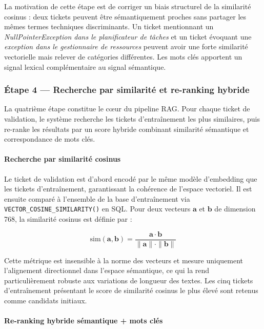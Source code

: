 La motivation de cette étape est de corriger un biais structurel de la similarité cosinus : deux tickets peuvent être sémantiquement proches sans partager les mêmes termes techniques discriminants. Un ticket mentionnant un \textit{NullPointerException dans le planificateur de tâches} et un ticket évoquant une \textit{exception dans le gestionnaire de ressources} peuvent avoir une forte similarité vectorielle mais relever de catégories différentes. Les mots clés apportent un signal lexical complémentaire au signal sémantique.

\subsubsection{Étape 4 — Recherche par similarité et re-ranking hybride}

La quatrième étape constitue le cœur du pipeline RAG. Pour chaque ticket de validation, le système recherche les tickets d'entraînement les plus similaires, puis re-ranke les résultats par un score hybride combinant similarité sémantique et correspondance de mots clés.

\paragraph{Recherche par similarité cosinus}

Le ticket de validation est d'abord encodé par le même modèle d'embedding que les tickets d'entraînement, garantissant la cohérence de l'espace vectoriel. Il est ensuite comparé à l'ensemble de la base d'entraînement via \texttt{VECTOR\_COSINE\_SIMILARITY()} en SQL. Pour deux vecteurs $\mathbf{a}$ et $\mathbf{b}$ de dimension 768, la similarité cosinus est définie par :

$$\text{sim}(\mathbf{a}, \mathbf{b}) = \frac{\mathbf{a} \cdot \mathbf{b}}{\|\mathbf{a}\| \cdot \|\mathbf{b}\|}$$

Cette métrique est insensible à la norme des vecteurs et mesure uniquement l'alignement directionnel dans l'espace sémantique, ce qui la rend particulièrement robuste aux variations de longueur des textes. Les cinq tickets d'entraînement présentant le score de similarité cosinus le plus élevé sont retenus comme candidats initiaux.

\paragraph{Re-ranking hybride sémantique + mots clés}

